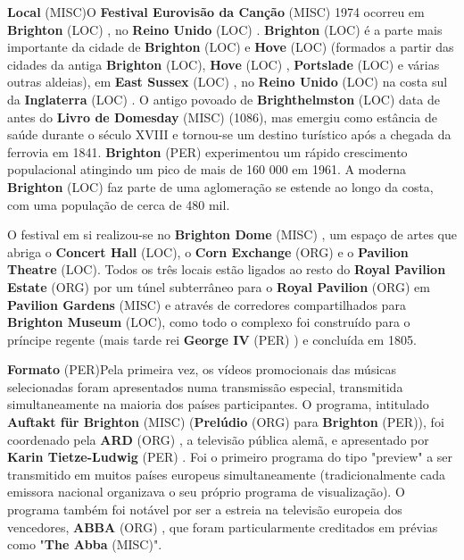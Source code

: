 \documentclass[12pt,a4paper]{article}
\begin{document}
\textbf{Local} (MISC)O \textbf{Festival Eurovisão da Canção} (MISC) 1974 ocorreu em \textbf{Brighton} (LOC) , no \textbf{Reino Unido} (LOC) . \textbf{Brighton} (LOC) é a parte mais importante da cidade de \textbf{Brighton} (LOC) e \textbf{Hove} (LOC) (formados a partir das cidades da antiga \textbf{Brighton} (LOC), \textbf{Hove} (LOC) , \textbf{Portslade} (LOC) e várias outras aldeias), em \textbf{East Sussex} (LOC) , no \textbf{Reino Unido} (LOC) na costa sul da \textbf{Inglaterra} (LOC) . O antigo povoado de \textbf{Brighthelmston} (LOC) data de antes do \textbf{Livro de Domesday} (MISC) (1086), mas emergiu como estância de saúde durante o século XVIII e tornou-se um destino turístico após a chegada da ferrovia em 1841. \textbf{Brighton} (PER) experimentou um rápido crescimento populacional atingindo um pico de mais de 160 000 em 1961. A moderna \textbf{Brighton} (LOC) faz parte de uma aglomeração se estende ao longo da costa, com uma população de cerca de 480 mil.

O festival em si realizou-se no \textbf{Brighton Dome} (MISC) , um espaço de artes que abriga o \textbf{Concert Hall} (LOC), o \textbf{Corn Exchange} (ORG) e o \textbf{Pavilion Theatre} (LOC). Todos os três locais estão ligados ao resto do \textbf{Royal Pavilion Estate} (ORG) por um túnel subterrâneo para o \textbf{Royal Pavilion} (ORG) em \textbf{Pavilion Gardens} (MISC) e através de corredores compartilhados para \textbf{Brighton Museum} (LOC), como todo o complexo foi construído para o príncipe regente (mais tarde rei \textbf{George IV} (PER) ) e concluída em 1805.



\textbf{Formato} (PER)Pela primeira vez, os vídeos promocionais das músicas selecionadas foram apresentados numa transmissão especial, transmitida simultaneamente na maioria dos países participantes. O programa, intitulado \textbf{Auftakt für Brighton} (MISC) (\textbf{Prelúdio} (ORG) para \textbf{Brighton} (PER)), foi coordenado pela \textbf{ARD} (ORG) , a televisão pública alemã, e apresentado por \textbf{Karin Tietze-Ludwig} (PER) . Foi o primeiro programa do tipo "preview" a ser transmitido em muitos países europeus simultaneamente (tradicionalmente cada emissora nacional organizava o seu próprio programa de visualização). O programa também foi notável por ser a estreia na televisão europeia dos vencedores, \textbf{ABBA} (ORG) , que foram particularmente creditados em prévias como "\textbf{The Abba} (MISC)".
\end{document}
